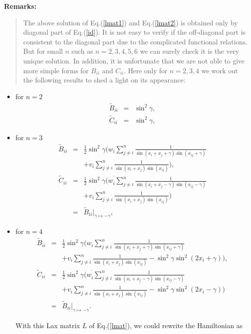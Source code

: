 \documentclass[a4paper,12pt]{article}
\begin{document}
\vspace{0.3cm} \noindent\textbf{Remarks:}

\begin{quotation}
The above solution of Eq.(\ref{lmat1}) and Eq.(\ref{lmat2}) is obtained only
by diagonal part of Eq.(\ref{id}). It is not easy to verify if the
off-diagonal part is consistent to the diagonal part due to the complicated
functional relations. But for small $n$ such as $n=2,3,4,5,6$ we can surely
check it is the very unique solution. In addition, it is unfortunate that we
are not able to give more simple forms for $B_{ii}$ and $C_{ii}$. Here only
for $n=2,3,4$ we work out the following results to shed a light on its
appearance:
\end{quotation}

\begin{itemize}
\item  for $n=2$
\begin{eqnarray}
\widetilde{B}_{ii} &=&\sin ^{2}\gamma ,  \nonumber \\
\widetilde{C}_{ii} &=&\sin ^{2}\gamma ,
\end{eqnarray}

\item  for $n=3$
\begin{eqnarray}
\widetilde{B}_{ii} &=&\frac{1}{2}\sin ^{2}\gamma \Big(w_{i}\sum_{j\neq i}^{n}%
\frac{1}{\sin (x_{i}+x_{j}+\gamma )\sin (x_{ij}+\gamma )}  \nonumber \\
&&+v_{i}\sum_{j\neq i}^{n}\frac{1}{\sin (x_{i}+x_{j})\sin (x_{ij})}\Big),
\nonumber \\
\widetilde{C}_{ii} &=&\frac{1}{2}\sin ^{2}\gamma \Big(w_{i}^{^{\prime
}}\sum_{j\neq i}^{n}\frac{1}{\sin (x_{i}+x_{j}-\gamma )\sin (x_{ij}-\gamma )}
\nonumber \\
&&+v_{i}\sum_{j\neq i}^{n}\frac{1}{\sin (x_{i}+x_{j})\sin (x_{ij})}\Big)
\nonumber \\
&=&\widetilde{B}_{ii}|_{\gamma \mapsto -\gamma },
\end{eqnarray}

\item  for $n=4$
\begin{eqnarray}
\widetilde{B}_{ii} &=&\frac{1}{2}\sin ^{2}\gamma \Big(w_{i}\sum_{j\neq i}^{n}%
\frac{1}{\sin (x_{i}+x_{j}+\gamma )\sin (x_{ij}+\gamma )}  \nonumber \\
&&+v_{i}\sum_{j\neq i}^{n}\frac{1}{\sin (x_{i}+x_{j})\sin (x_{ij})}-\sin
^{2}\gamma \sin ^{2}(2x_{i}+\gamma )\Big),  \nonumber \\
\widetilde{C}_{ii} &=&\frac{1}{2}\sin ^{2}\gamma \Big(w_{i}^{^{\prime
}}\sum_{j\neq i}^{n}\frac{1}{\sin (x_{i}+x_{j}-\gamma )\sin (x_{ij}-\gamma )}
\nonumber \\
&&+v_{i}\sum_{j\neq i}^{n}\frac{1}{\sin (x_{i}+x_{j})\sin (x_{ij})}-\sin
^{2}\gamma \sin ^{2}(2x_{i}-\gamma )\Big)  \nonumber \\
&=&\widetilde{B}_{ii}|_{\gamma \mapsto -\gamma }.
\end{eqnarray}

With this Lax matrix $L$ of Eq.(\ref{lmat}), we could rewrite the
Hamiltonian as
\end{itemize}
\end{document}
